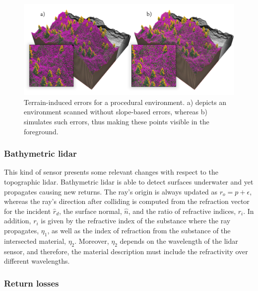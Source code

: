 \begin{figure}
    \centering
    \includegraphics[width=.9\linewidth]{figs/lidar_simulation/terrain_induced_errors.png}
	\caption{Terrain-induced errors for a procedural environment. a) depicts an environment scanned without slope-based errors, whereas b) simulates such errors, thus making these points visible in the foreground. }
	\label{fig:terrain_induced_errors}
\end{figure}

\subsubsection{Bathymetric \acrshort{lidar}}

This kind of sensor presents some relevant changes with respect to the topographic \acrshort{lidar}. Bathymetric \acrshort{lidar} is able to detect surfaces underwater and yet propagates causing new returns. The ray's origin is always updated as $r_{o} = p + \epsilon$, whereas the ray's direction after colliding is computed from the refraction vector for the incident $\hat{r}_{d}$, the surface normal, $\hat{n}$, and the ratio of refractive indices, $r_{i}$. In addition, $r_{i}$ is given by the refractive index of the substance where the ray propagates, $\eta_{1}$, as well as the index of refraction from the substance of the intersected material, $\eta_{2}$. Moreover, $\eta_{2}$ depends on the wavelength of the \acrshort{lidar} sensor, and therefore, the material description must include the refractivity over different wavelengths.

\subsubsection{Return losses}

